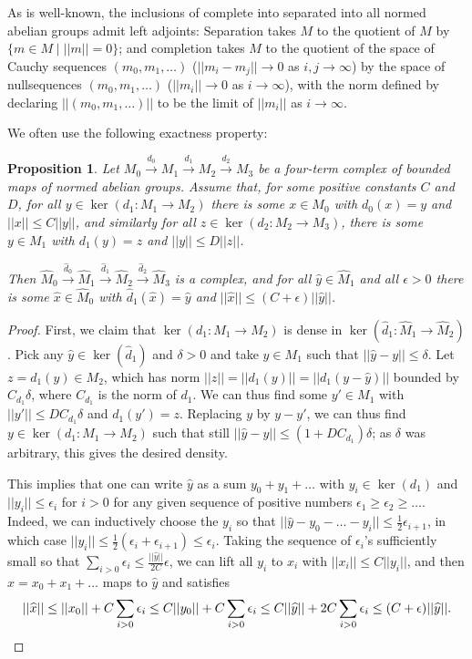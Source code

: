 \documentclass[11pt]{amsbook}
\numberwithin{equation}{section}
\numberwithin{theorem}{section}
\newtheorem{proposition}[theorem]{Proposition}
\theoremstyle{definition}
\begin{document}
As is well-known, the inclusions of complete into separated into all normed abelian groups admit left adjoints: Separation takes $M$ to the quotient of $M$ by $\{m\in M\mid ||m||=0\}$; and completion takes $M$ to the quotient of the space of Cauchy sequences $(m_0,m_1,\ldots)$ ($||m_i-m_j||\to 0$ as $i,j\to \infty$) by the space of nullsequences $(m_0,m_1,\ldots)$ ($||m_i||\to 0$ as $i\to \infty$), with the norm defined by declaring $||(m_0,m_1,\ldots)||$ to be the limit of $||m_i||$ as $i\to \infty$.

We often use the following exactness property:

\begin{proposition}\label{prop:completeexact} Let $M_0\xrightarrow{d_0} M_1\xrightarrow{d_1} M_2\xrightarrow{d_2} M_3$ be a four-term complex of bounded maps of normed abelian groups. Assume that, for some positive constants $C$ and $D$, for all $y\in \ker(d_1: M_1\to M_2)$ there is some $x\in M_0$ with $d_0(x)=y$ and $||x||\leq C||y||$, and similarly for all $z\in \ker(d_2: M_2\to M_3)$, there is some $y\in M_1$ with $d_1(y)=z$ and $||y||\leq D||z||$.

Then $\widehat{M}_0\xrightarrow{\widehat{d}_0} \widehat{M}_1\xrightarrow{\widehat{d}_1} \widehat{M}_2\xrightarrow{\widehat{d}_2} \widehat{M}_3$ is a complex, and for all $\widehat{y}\in \widehat{M}_1$ and all $\epsilon>0$ there is some $\widehat{x}\in \widehat{M}_0$ with $\widehat{d}_1(\widehat{x})=\widehat{y}$ and $||\widehat{x}||\leq (C+\epsilon)||\widehat{y}||$.
\end{proposition}

\begin{proof} First, we claim that $\ker(d_1: M_1\to M_2)$ is dense in $\ker(\widehat{d}_1: \widehat{M}_1\to \widehat{M}_2)$. Pick any $\widehat{y}\in \ker(\widehat{d}_1)$ and $\delta>0$ and take $y\in M_1$ such that $||\widehat{y}-y||\leq \delta$. Let $z=d_1(y)\in M_2$, which has norm $||z||=||d_1(y)||=||d_1(y-\widehat{y})||$ bounded by $C_{d_1}\delta$, where $C_{d_1}$ is the norm of $d_1$. We can thus find some $y'\in M_1$ with $||y'||\leq DC_{d_1}\delta$ and $d_1(y')=z$. Replacing $y$ by $y-y'$, we can thus find $y\in \ker(d_1: M_1\to M_2)$ such that still $||\widehat{y}-y||\leq (1+DC_{d_1})\delta$; as $\delta$ was arbitrary, this gives the desired density.

This implies that one can write $\widehat{y}$ as a sum $y_0+y_1+\ldots$ with $y_i\in \ker(d_1)$ and $||y_i||\leq \epsilon_i$ for $i>0$ for any given sequence of positive numbers $\epsilon_1\geq \epsilon_2\geq \ldots$. Indeed, we can inductively choose the $y_i$ so that $||\widehat{y}-y_0-\ldots-y_i||\leq \tfrac 12 \epsilon_{i+1}$, in which case $||y_i||\leq \tfrac 12(\epsilon_i+\epsilon_{i+1})\leq \epsilon_i$. Taking the sequence of $\epsilon_i$'s sufficiently small so that $\sum_{i>0} \epsilon_i\leq \tfrac {||\widehat{y}||}{2C} \epsilon$, we can lift all $y_i$ to $x_i$ with $||x_i||\leq C||y_i||$, and then $\widehat{x}=x_0+x_1+\ldots$ maps to $\widehat{y}$ and satisfies
\[
||\widehat{x}||\leq ||x_0||+C\sum_{i>0} \epsilon_i\leq C||y_0||+C\sum_{i>0} \epsilon_i\leq C||\widehat{y}||+2C\sum_{i>0} \epsilon_i\leq (C+\epsilon)||\widehat{y}||.\qedhere
\]
\end{proof}
\end{document}
